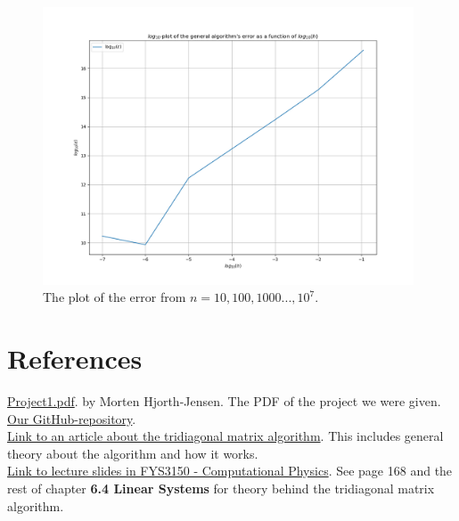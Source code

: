 \documentclass{article}
\begin{document}
\begin{figure}[ht]
	\centering
	\includegraphics[width = 11cm]{program/error.png}
	\caption{The plot of the error from $n = 10, 100, 1000 ... , 10^7$. }
  \label{fig:errorpng}
\end{figure}



\clearpage

\vspace{1cm}

\section{References} \label{sec:References}

\href{https://github.com/CompPhysics/ComputationalPhysics/blob/master/doc/Projects/2019/Project1/pdf/Project1.pdf}{Project1.pdf}. by Morten Hjorth-Jensen. The PDF of the project we were given.\\
\href{https://github.com/Erikbgram/Fys3150}{Our GitHub-repository}. \\

\href{http://www.industrial-maths.com/ms6021_thomas.pdf}{Link to an article about the tridiagonal matrix algorithm}. This includes general theory about the algorithm and how it works. \\

\href{https://github.com/CompPhysics/ComputationalPhysics/blob/master/doc/Lectures/lectures2015.pdf}{Link to lecture slides in FYS3150 - Computational Physics}. See page 168 and the rest of chapter \textbf{6.4 Linear Systems} for theory behind the tridiagonal matrix algorithm.






\end{document}
